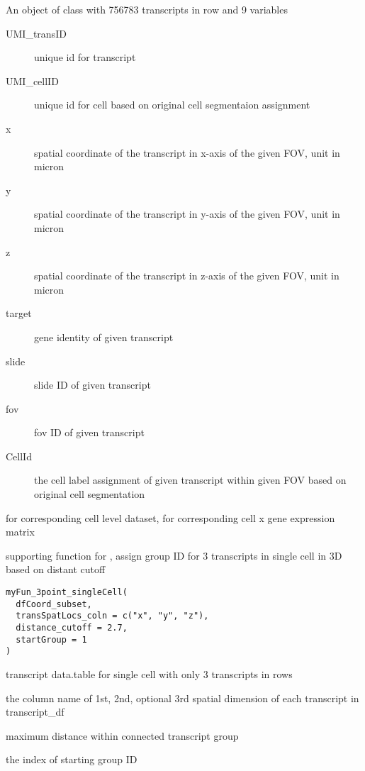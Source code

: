 \documentclass[letterpaper]{book}
\begin{document}
%
\begin{Format}
An object of class  with 756783 transcripts in row and 9 variables
\begin{description}

\item[UMI\_transID] unique id for transcript
\item[UMI\_cellID] unique id for cell based on original cell segmentaion assignment
\item[x] spatial coordinate of the transcript in x-axis of the given FOV, unit in micron
\item[y] spatial coordinate of the transcript in y-axis of the given FOV, unit in micron
\item[z] spatial coordinate of the transcript in z-axis of the given FOV, unit in micron
\item[target] gene identity of given transcript
\item[slide] slide ID of given transcript
\item[fov] fov ID of given transcript
\item[CellId] the cell label assignment of given transcript within given FOV based on original cell segmentation

\end{description}

\end{Format}
%
\begin{SeeAlso}
 for corresponding cell level dataset,  for corresponding cell x gene expression matrix
\end{SeeAlso}
%
\begin{Description}
supporting function for , assign group ID for 3 transcripts in single cell in 3D based on distant cutoff
\end{Description}
%
\begin{Usage}
\begin{verbatim}
myFun_3point_singleCell(
  dfCoord_subset,
  transSpatLocs_coln = c("x", "y", "z"),
  distance_cutoff = 2.7,
  startGroup = 1
)
\end{verbatim}
\end{Usage}
%
\begin{Arguments}
\begin{ldescription}
\item[\code{dfCoord\_subset}] transcript data.table for single cell with only 3 transcripts in rows

\item[\code{transSpatLocs\_coln}] the column name of 1st, 2nd, optional 3rd spatial dimension of each transcript in transcript\_df

\item[\code{distance\_cutoff}] maximum distance within connected transcript group

\item[\code{startGroup}] the index of starting group ID
\end{ldescription}
\end{Arguments}
\end{document}
